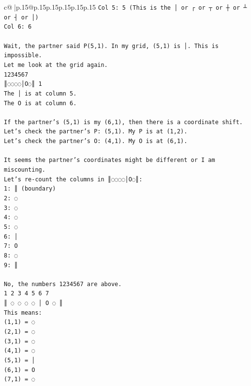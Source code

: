 \documentclass{article}
\begin{document}
{\begin{supertabular}{c@{$\;$}|p{.15\linewidth}@{}p{.15\linewidth}p{.15\linewidth}p{.15\linewidth}p{.15\linewidth}p{.15\linewidth}}
{{{\texttt{Col 5: 5 (This is the │ or ┌ or ┬ or ┼ or ┴ or ┤ or │)} \\
\texttt{Col 6: 6} \\
\\ 
\texttt{Wait, the partner said P(5,1). In my grid, (5,1) is │. This is impossible.} \\
\texttt{Let me look at the grid again.} \\
\texttt{1234567} \\
\texttt{║◌◌◌◌│O◌║ 1} \\
\texttt{The │ is at column 5.} \\
\texttt{The O is at column 6.} \\
\\ 
\texttt{If the partner's (5,1) is my (6,1), then there is a coordinate shift.} \\
\texttt{Let's check the partner's P: (5,1). My P is at (1,2).} \\
\texttt{Let's check the partner's O: (4,1). My O is at (6,1).} \\
\\ 
\texttt{It seems the partner's coordinates might be different or I am miscounting.} \\
\texttt{Let's re{-}count the columns in ║◌◌◌◌│O◌║:} \\
\texttt{1: ║ (boundary)} \\
\texttt{2: ◌} \\
\texttt{3: ◌} \\
\texttt{4: ◌} \\
\texttt{5: ◌} \\
\texttt{6: │} \\
\texttt{7: O} \\
\texttt{8: ◌} \\
\texttt{9: ║} \\
\\ 
\texttt{No, the numbers 1234567 are above.} \\
\texttt{1 2 3 4 5 6 7} \\
\texttt{║ ◌ ◌ ◌ ◌ │ O ◌ ║} \\
\texttt{This means:} \\
\texttt{(1,1) = ◌} \\
\texttt{(2,1) = ◌} \\
\texttt{(3,1) = ◌} \\
\texttt{(4,1) = ◌} \\
\texttt{(5,1) = │} \\
\texttt{(6,1) = O} \\
\texttt{(7,1) = ◌} \\
}}}
\end{supertabular}}
\end{document}
